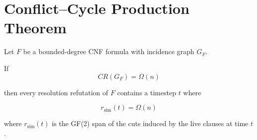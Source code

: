 \section{Conflict–Cycle Production Theorem}

\begin{theorem}
Let $F$ be a bounded-degree CNF formula with incidence graph $G_F$.

If
\[
CR(G_F)=\Omega(n)
\]

then every resolution refutation of $F$ contains a timestep $t$ where

\[
r_{\mathrm{sim}}(t)=\Omega(n)
\]

where $r_{\mathrm{sim}}(t)$ is the GF(2) span of the cuts induced by the
live clauses at time $t$.
\end{theorem}
